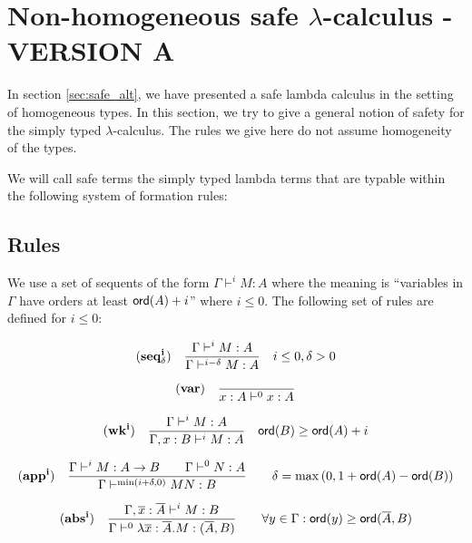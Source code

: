\clearpage
\section{Non-homogeneous safe $\lambda$-calculus - VERSION A}

In section \ref{sec:safe_alt}, we have presented a safe lambda calculus in the setting of homogeneous types.
In this section, we try to give a general notion of safety for the simply typed $\lambda$-calculus.
The rules we give here do not assume homogeneity of the types.

We will call safe terms the simply typed lambda terms that are typable within the following system of formation rules:

\subsection{Rules}

 We use a set of sequents of the form $\Gamma \vdash^{i} M :
A$ where the meaning is ``variables in $\Gamma$ have orders at least
${\sf ord}(A)+i$'' where $i \leq 0$. The following set of rules are
defined for $i \leq 0$:

$$ \mathbf{(seq^i_\delta)} \quad \frac{\displaystyle \Gamma \vdash^{i} M : A}{\Gamma \vdash^{i-\delta} M : A} \quad i \leq 0, \delta > 0  $$

$$ \mathbf{(var)} \quad  \frac{\displaystyle }{x : A\vdash^{0} x : A} $$

$$ \mathbf{(wk^i)} \quad  \frac{\displaystyle \Gamma \vdash^i M : A}{\Gamma , x : B \vdash^i M : A} \quad {\sf ord}(B) \geq {\sf ord}(A) + i $$

$$ \mathbf{(app^i)} \quad  \frac{\displaystyle \Gamma \vdash^i M : A\rightarrow B
                                        \qquad \Gamma \vdash^{0} N : A}{\Gamma  \vdash^{\min(i+\delta,0)} M N : B}
                                    \qquad
                                   \delta = \max\left(0, 1 + {\sf ord}(A) - {\sf ord}(B)\right)$$

$$ \mathbf{(abs^i)} \quad  \frac{\displaystyle \Gamma, \overline{x} : \overline{A} \vdash^{i} M : B}{\Gamma  \vdash^{0} \lambda \overline{x} : \overline{A} . M : (\overline{A},B)} \qquad
                                       \forall y \in \Gamma : {\sf ord}(y) \geq {\sf ord}(\overline{A},B)\\
                                   $$


